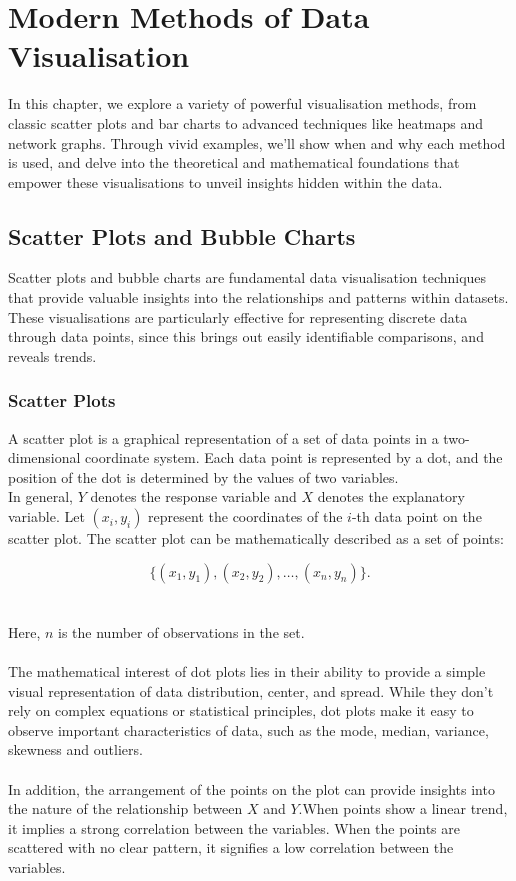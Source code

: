 \documentclass{article}\usepackage[]{graphicx}\usepackage[]{xcolor}
\begin{document}
\newpage

\section{Modern Methods of Data Visualisation}
In this chapter, we explore a variety of powerful visualisation methods, from classic scatter plots and bar charts to advanced techniques like heatmaps and network graphs. Through vivid examples, we'll show when and why each method is used, and delve into the theoretical and mathematical foundations that empower these visualisations to unveil insights hidden within the data.

\subsection{Scatter Plots and Bubble Charts}
Scatter plots and bubble charts are fundamental data visualisation techniques that provide valuable insights into the relationships and patterns within datasets. These visualisations are particularly effective for representing discrete data through data points, since this brings out easily identifiable comparisons, and reveals trends.

\subsubsection{Scatter Plots}
A scatter plot is a graphical representation of a set of data points in a two-dimensional coordinate system. Each data point is represented by a dot, and the position of the dot is determined by the values of two variables. 
\\  
In general, \(Y\) denotes the response variable and \(X\) denotes the explanatory variable. Let \((x_i, y_i)\) represent the coordinates of the \(i\)-th data point on the scatter plot. The scatter plot can be mathematically described as a set of points:

\[ \{(x_1, y_1), (x_2, y_2), \ldots, (x_n, y_n)\} .\]
\\  
\\Here, \(n\) is the number of observations in the set.
\\
\\The mathematical interest of dot plots lies in their ability to provide a simple visual representation of data distribution, center, and spread. While they don't rely on complex equations or statistical principles, dot plots make it easy to observe important characteristics of data, such as the mode, median, variance, skewness and outliers. \\ 
\\In addition, the arrangement of the points on the plot can provide insights into the nature of the relationship between \(X\) and \(Y\).When points show a linear trend, it implies a strong correlation between the variables. When the points are scattered with no clear pattern, it signifies a low correlation between the variables. \\
\end{document}
